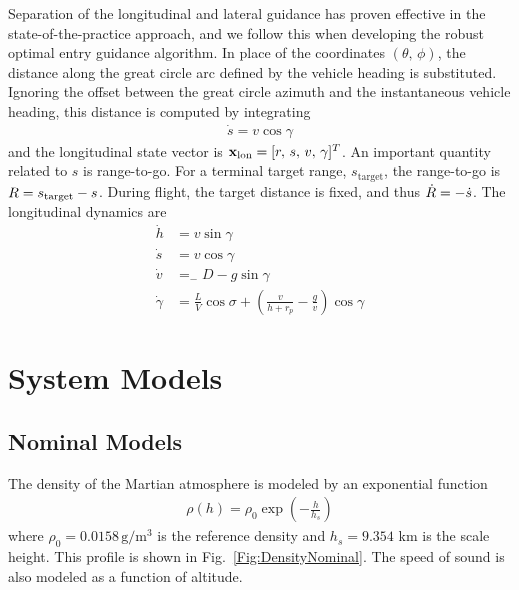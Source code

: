 Separation of the longitudinal and lateral guidance has proven effective in the state-of-the-practice approach, and we follow this when developing the robust optimal entry guidance algorithm. In place of the coordinates $(\theta,\,\phi)$, the distance along the great circle arc defined by the vehicle heading is substituted. Ignoring the offset between the great circle azimuth and the instantaneous vehicle heading, this distance is computed by integrating
\begin{align}
	\dot{s} = v\cos\gamma
\end{align}
and the longitudinal state vector is $\mathbf{x}_{\mathrm{lon}} = [r,\,s,\,v,\,\gamma]^T$. An important quantity related to $s$ is range-to-go. For a terminal target range, $s_{\mathrm{target}}$, the range-to-go is $R=s_{\mathrm{target}}-s$. During flight, the target distance is fixed, and thus $\dot{R}=-\dot{s}$.
The longitudinal dynamics are 
\begin{align}
	\dot{h} &= v\sin\gamma \label{Eq:dynamics:altitude:time}\\
	\dot{s} &= v\cos\gamma \\
	\dot{v} &= _-D - g\sin\gamma \label{Eq:dynamics_velocity:time}\\ 
	\dot{\gamma} &= \frac{L}{V}\cos\sigma + \left(\frac{v}{h+r_p}-\frac{g}{v}\right)\cos\gamma \label{Eq:dynamics:fpa:time}
\end{align}

\section{System Models}
\subsection{Nominal Models}
The density of the Martian atmosphere is modeled by an exponential function
\begin{align}
	\rho(h) = \rho_0\exp(-\frac{h}{h_s}) \label{Eq:Density}
\end{align}
where $\rho_0=0.0158\,\mathrm{g}/\mathrm{m}^3$ is the reference density and $h_s=9.354$ km is the scale height. This profile is shown in Fig.~\ref{Fig:DensityNominal}. The speed of sound is also modeled as a function of altitude. 

